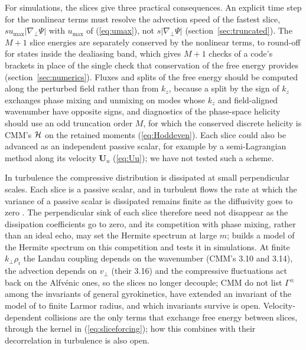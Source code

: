 For simulations, the slices give three practical consequences. An explicit time step for the nonlinear terms must resolve the advection speed of the fastest slice, $su_{\max}|\nabla_\perp\Psi|$ with $u_{\max}$ of (\ref{eq:umax}), not $s|\nabla_\perp\Psi|$ (section~\ref{sec:truncated}). The $M+1$ slice energies are separately conserved by the nonlinear terms, to round-off for states inside the dealiasing band, which gives $M+1$ checks of a code's brackets in place of the single check that conservation of the free energy provides (section~\ref{sec:numerics}). Fluxes and splits of the free energy should be computed along the perturbed field rather than from $k_z$, because a split by the sign of $k_z$ exchanges phase mixing and unmixing on modes whose $k_z$ and field-aligned wavenumber have opposite signs, and diagnostics of the phase-space helicity should use an odd truncation order $M$, for which the conserved discrete helicity is CMM's $\mathcal H$ on the retained moments (\ref{eq:Hoddeven}). Each slice could also be advanced as an independent passive scalar, for example by a semi-Lagrangian method along its velocity $\boldsymbol U_u$ (\ref{eq:Uu}); we have not tested such a scheme.

In turbulence the compressive distribution is dissipated at small perpendicular scales. Each slice is a passive scalar, and in turbulent flows the rate at which the variance of a passive scalar is dissipated remains finite as the diffusivity goes to zero \citep{ShraimanSiggia2000,FalkovichGawedzkiVergassola2001}. The perpendicular sink of each slice therefore need not disappear as the dissipation coefficients go to zero, and its competition with phase mixing, rather than an ideal echo, may set the Hermite spectrum at large $m$; \citet{KanekarPrep} builds a model of the Hermite spectrum on this competition and tests it in simulations. At finite $k_\perp\rho_i$ the Landau coupling depends on the wavenumber (CMM's 3.10 and 3.14), the advection depends on $v_\perp$ (their 3.16) and the compressive fluctuations act back on the Alfv\'enic ones, so the slices no longer decouple; CMM do not list $\Gamma^\pm$ among the invariants of general gyrokinetics, \citet{CostelloPlunk2025} have extended an invariant of the model of \citet{Plunk2015} to finite Larmor radius, and which invariants survive is open. Velocity-dependent collisions are the only terms that exchange free energy between slices, through the kernel in (\ref{eq:sliceforcing}); how this combines with their decorrelation in turbulence is also open.

